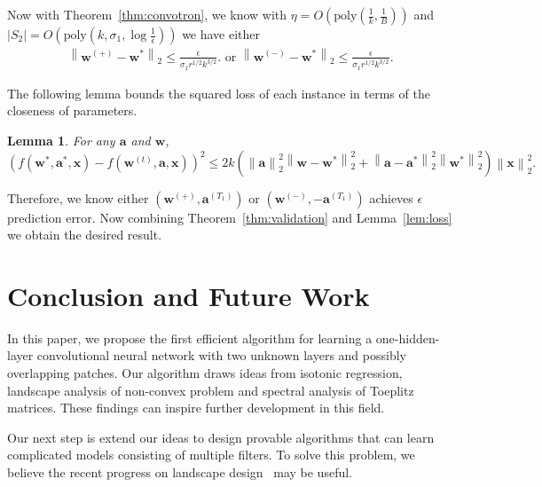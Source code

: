 \documentclass[11pt]{article}
\newcommand{\poly}{\mathrm{poly}}
\newcommand{\vect}[1]{\mathbf{#1}}
\newcommand{\norm}[1]{\left\|#1\right\|}
\newcommand{\abs}[1]{\left|#1\right|}
\newtheorem{lem}{Lemma}[section]
\begin{document}
Now with Theorem~\ref{thm:convotron}, we know with $\eta = O\left(\poly\left(\frac{1}{k},\frac{1}{B}\right)\right)$ and $\abs{S_2} = O\left(\poly\left(k,\sigma_1,\log\frac{1}{\epsilon}\right)\right)$ we have either \begin{align*}
\norm{\vect{w}^{\left(+\right)} - \vect{w}^*}_2 \le \frac{\epsilon}{\sigma_1 r^{1/2}k^{3/2}}. \text{ or }\norm{\vect{w}^{\left(-\right)}-\vect{w}^*}_2 \le \frac{\epsilon}{\sigma_1 r^{1/2}k^{3/2}}.
\end{align*}

The following lemma bounds the squared loss of each instance in terms of the closeness of parameters.
\begin{lem}\label{lem:bound}
For any $\vect{a}$ and $\vect{w}$,
\[
\left(f\left(\vect{w}^*, \vect{a}^*, \vect{x}\right) - f\left(\vect{w}^{\left(t\right)}, \vect{a}, \vect{x}\right)\right)^2 \leq 2k \left(\norm{\vect{a}}_2^2\norm{\vect{w} - \vect{w}^*}_2^2 + \norm{\vect{a} - \vect{a}^*}_2^2\norm{\vect{w}^*}_2^2\right)\norm{\vect{x}}_2^2.
\]
\end{lem}
Therefore, we know either $\left(\vect{w}^{(+)},\vect{a}^{(T_1)}\right)$ or $\left(\vect{w}^{(-)},-\vect{a}^{(T_1)}\right)$ achieves $\epsilon$ prediction error.
Now combining Theorem~\ref{thm:validation} and Lemma~\ref{lem:loss} we obtain the desired result.



%

\section{Conclusion and Future Work}
\label{sec:con}
In this paper, we propose the first efficient algorithm for learning a one-hidden-layer convolutional neural network with two unknown layers and possibly overlapping patches.
Our algorithm draws ideas from isotonic regression, landscape analysis of non-convex problem and spectral analysis of Toeplitz matrices.
These findings can inspire further development in this field.

Our next step is extend our ideas to design provable algorithms that can learn complicated models consisting of multiple filters.
To solve this problem, we believe the recent progress on landscape design~\citep{ge2017learning} may be useful.
\end{document}
